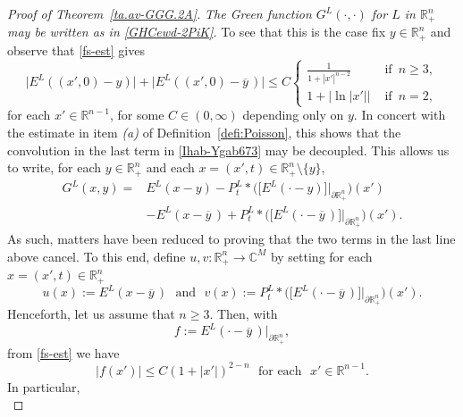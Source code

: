 \documentclass[11pt,reqno]{amsart}
\numberwithin{equation}{section}
\theoremstyle{remark}
\begin{document}
\begin{proof}[Proof of Theorem~\ref{ta.av-GGG.2A}]
\vskip 0.08in
 \textit{The Green function $G^L(\cdot,\cdot)$ for $L$ in ${\mathbb{R}}^n_{+}$ 
may be written as in \eqref{GHCewd-2PiK}.
}
\vskip 0.08in
To see that this is the case fix $y\in{\mathbb{R}}^n_{+}$ and observe that \eqref{fs-est} gives
%
\begin{equation}\label{IhJG-YD-54}
\big|E^L((x',0)-y)\big|+\big|E^L((x',0)-\overline{y}\,)\big|\leq C\left\{
\begin{array}{ll}
\displaystyle
\frac{1}{1+|x'|^{n-2}} & \text{ if }\,n\geq 3,
\\[12pt]
1+|\ln|x'|| & \text{ if }\,n=2,
\end{array}
\right.
\end{equation}
%
for each $x'\in{\mathbb{R}}^{n-1}$, for some $C\in(0,\infty)$ depending only on $y$. 
In concert with the estimate in item {\it (a)} of Definition~\ref{defi:Poisson},
this shows that the convolution in the last term in \eqref{Ihab-Ygab673} may be decoupled. This allows us to write, 
for each $y\in{\mathbb{R}}^n_{+}$ and each $x=(x',t)\in{\mathbb{R}}^n_{+}\setminus\{y\}$, 
%
\begin{align}\label{Ihioh-he2}
G^L(x,y)= & E^L(x-y)
-P^L_t\ast\Big(\big[E^L(\cdot-y)\big]\big|_{\partial{\mathbb{R}}^n_{+}}\Big)(x')
\nonumber\\[4pt]
& -E^L(x-\overline{y}\,)+P^L_t\ast\Big(\big[E^L(\cdot-\overline{y}\,)
\big]\big|_{\partial{\mathbb{R}}^n_{+}}\Big)(x').
\end{align}
%
As such, matters have been reduced to proving that the two terms in the last line above cancel. To this end, define 
$u,v:{\mathbb{R}}^n_{+}\to{\mathbb{C}}^M$ by setting for each $x=(x',t)\in{\mathbb{R}}^n_{+}$
%
\begin{equation}\label{TCVV-yr6y}
u(x):=E^L(x-\overline{y}\,)\,\,\text{ and }\,\,
v(x):=P^L_t\ast\Big(\big[E^L(\cdot-\overline{y}\,)\big]\big|_{\partial{\mathbb{R}}^n_{+}}\Big)(x').
\end{equation}
%
Henceforth, let us assume that $n\geq 3$. Then, with 
%
\begin{equation}\label{TCVV-yr6y.123.FFF}
f:=E^L(\cdot-\overline{y}\,)\big|_{\partial{\mathbb{R}}^n_{+}}, 
\end{equation}
%
from \eqref{fs-est} we have 
%
\begin{equation}\label{TCVV-yr6y.123}
|f(x')|\leq C(1+|x'|)^{2-n}\,\,\text{ for each }\,\,x'\in{\mathbb{R}}^{n-1}. 
\end{equation}
%
In particular, 
%
\begin{equation}\label{TCVV-yr6y.123-bis}

\end{equation}
\end{proof}
\end{document}
